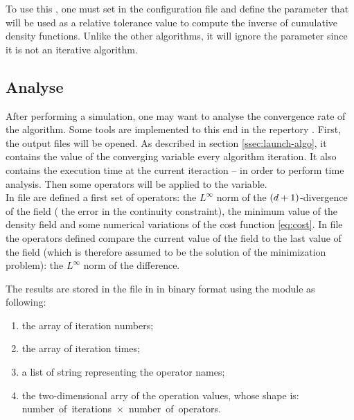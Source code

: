        To use this , one must set  in the configuration file and define the parameter
         that will be used as a relative tolerance value to compute the inverse of cumulative density functions.
        Unlike the other algorithms, it will ignore the parameter  since it is not an iterative
        algorithm.

    \subsection{Analyse\label{sssec:analyse}}
    \noindent

        After performing a simulation, one may want to analyse the convergence rate of the algorithm. Some tools are implemented
        to this end in the repertory . First, the output files will be opened. As described in section
        \ref{ssec:launch-algo}, it contains the value of the converging variable every  algorithm iteration. It
        also contains the execution time at the current iteraction -- in order to perform time analysis. Then some operators
        will be applied to the variable.\\

        In file  are defined a first set of operators: the $L^\infty$ norm of the $\left(d+1\right)$-divergence of the field
        (\ie{} the error in the continuity constraint), the minimum value of the density field and some numerical variations of the cost
        function \eqref{eq:cost}. In file  the operators defined compare the current value of the field to the last
        value of the field (which is therefore assumed to be the solution of the minimization problem): the $L^\infty$ norm of the difference.

        The results are stored in the file  in  in binary format using the \cpck{} module as following:
        \begin{enumerate}
            \item the \numpy{} array of iteration numbers;
            \item the \numpy{} array of iteration times;
            \item a list of string representing the operator names;
            \item the \numpy{} two-dimensional arry of the operation values, whose shape is:\\number~of~iterations~$\times$~number~of~operators.
        \end{enumerate}

